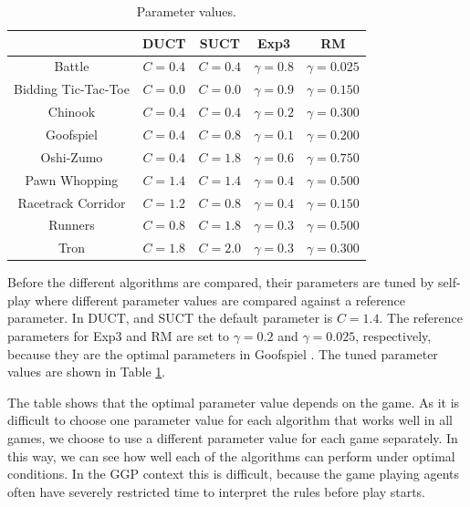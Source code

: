 \documentclass[conference]{IEEEtran}
\begin{document}
\begin{table}[t!]
\centering
\begin{tabular}{|c|c|c|c|c|}
\hline
                  & DUCT    & SUCT    & Exp3           & RM  \\
\hline
Battle            & $C=0.4$ & $C=0.4$ & $\gamma = 0.8$ & $\gamma = 0.025$  \\ 
Bidding Tic-Tac-Toe  & $C=0.0$ & $C=0.0$ & $\gamma = 0.9$ & $\gamma = 0.150$   \\ 
Chinook           & $C=0.4$ & $C=0.4$ & $\gamma = 0.2$ & $\gamma = 0.300$ \\ 
Goofspiel         & $C=0.4$ & $C=0.8$ & $\gamma = 0.1$ & $\gamma = 0.200$ \\ 
Oshi-Zumo         & $C=0.4$ & $C=1.8$ & $\gamma = 0.6$ & $\gamma = 0.750$ \\ 
Pawn Whopping      & $C=1.4$ & $C=1.4$ & $\gamma = 0.4$ & $\gamma = 0.500$  \\ 
Racetrack Corridor & $C=1.2$ & $C=0.8$ & $\gamma = 0.4$ & $\gamma = 0.150$\\ 
Runners           & $C=0.8$ & $C=1.8$ & $\gamma = 0.3$ & $\gamma = 0.500$ \\
Tron              & $C=1.8$ & $C=2.0$ & $\gamma = 0.3$ & $\gamma = 0.300$ \\
 \hline
\end{tabular}
\caption{Parameter values. \label{tbl:parameters}}
\vspace{-1cm}
\end{table}
Before the different algorithms are compared, their parameters are tuned by self-play where different parameter 
values are compared against a reference parameter. In DUCT, and SUCT the default parameter is $C=1.4$. The reference
parameters for Exp3 and RM are set to $\gamma = 0.2$ and $\gamma = 0.025$, respectively, because they are the optimal 
parameters in Goofspiel \cite{Lanctot13Goofspiel}. The tuned parameter values are shown in Table \ref{tbl:parameters}. 

The table shows that the optimal parameter value depends on the game. As it is difficult to choose one parameter value 
for each algorithm that works well in all games, we choose to use a different parameter value for each game separately. 
In this way, we can see how well each of the algorithms can perform under optimal conditions. In the GGP context 
this is difficult, because the game playing agents often have severely restricted time to interpret the 
rules before play starts. 
\end{document}
